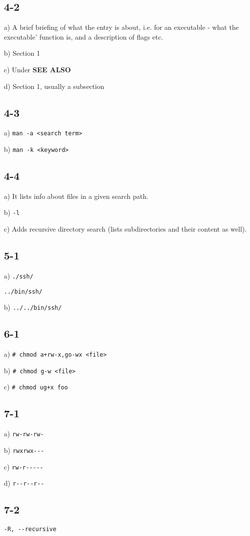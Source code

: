 \subsection{4-2}
a) A brief briefing of what the entry is about, i.e. for an executable - what the executable' function is,
   and a description of flags etc.

b) Section 1

c) Under \textbf{SEE ALSO}

d) Section 1, usually a subsection

\subsection{4-3}
a) \verb=man -a <search term>=

b) \verb=man -k <keyword>=

\subsection{4-4}
a) It lists info about files in a given search path.

b) \verb=-l=

c) Adds recursive directory search (lists subdirectories and their content as well).

\subsection{5-1}
a) \verb=./ssh/=

   \verb=../bin/ssh/ =

b) \verb=../../bin/ssh/=

\subsection{6-1}
a) \verb=# chmod a+rw-x,go-wx <file>=

b) \verb=# chmod g-w <file>=

c) \verb=# chmod ug+x foo=

\subsection{7-1}
a) \verb=rw-rw-rw-=

b) \verb=rwxrwx---=

c) \verb=rw-r-----=

d) \verb=r--r--r--=

\subsection{7-2}
\verb=-R, --recursive=

